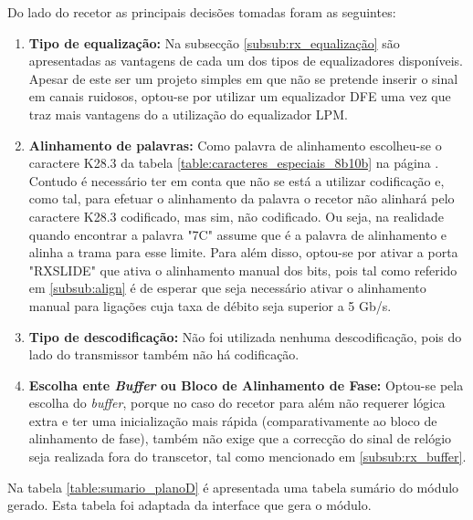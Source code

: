 Do lado do recetor as principais decisões tomadas foram as seguintes:
\begin{enumerate}
	\item \textbf{Tipo de equalização:} Na subsecção \ref{subsub:rx_equalização} são apresentadas as vantagens de cada um dos tipos de equalizadores disponíveis. Apesar de este ser um projeto simples em que não se pretende inserir o sinal em canais ruidosos, optou-se por utilizar um equalizador DFE uma vez que traz mais vantagens do a utilização do equalizador LPM.
	\item \textbf{Alinhamento de palavras:} Como palavra de alinhamento escolheu-se o caractere K28.3 da tabela \ref{table:caracteres_especiais_8b10b} na página \pageref{table:caracteres_especiais_8b10b}. Contudo é necessário ter em conta que não se está a utilizar codificação e, como tal, para efetuar o alinhamento da palavra o recetor não alinhará pelo caractere K28.3 codificado, mas sim, não codificado. Ou seja, na realidade quando encontrar a palavra "7C" assume que é a palavra de alinhamento e alinha a trama para esse limite. Para além disso, optou-se por ativar a porta "RXSLIDE" que ativa o alinhamento manual dos bits, pois tal como referido em \ref{subsub:align} é de esperar que seja necessário ativar o alinhamento manual para ligações cuja taxa de débito seja superior a 5 Gb/s.
	\item \textbf{Tipo de descodificação:} Não foi utilizada nenhuma descodificação, pois do lado do transmissor também não há codificação.
	\item \textbf{Escolha ente \textit{Buffer} ou Bloco de Alinhamento de Fase:} Optou-se pela escolha do \textit{buffer}, porque no caso do recetor para além não requerer lógica extra e ter uma inicialização mais rápida (comparativamente ao bloco de alinhamento de fase), também não exige que a correcção do sinal de relógio seja realizada fora do transcetor, tal como mencionado em \ref{subsub:rx_buffer}.
\end{enumerate}

Na tabela \ref {table:sumario_planoD} é apresentada uma tabela sumário do módulo gerado. Esta tabela foi adaptada da interface que gera o módulo.

